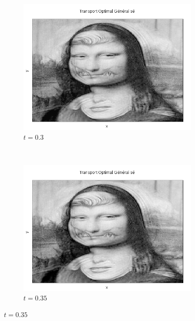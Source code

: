 \documentclass[a4paper,12pt]{article}
\begin{document}
\begin{figure}[!h]
\begin{subfigure}[b]{0.23\linewidth}
\includegraphics[width=\linewidth]{img/2DMorphing/T_00067.png}
\caption*{$t=0.3$}
\end{subfigure}
~
\begin{subfigure}[b]{0.23\linewidth}
\includegraphics[width=\linewidth]{img/2DMorphing/T_00078.png}
\caption*{$t=0.35$}
\end{subfigure}


\end{figure}
\end{document}
